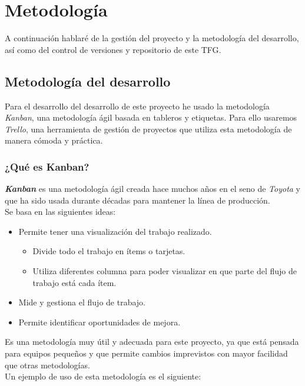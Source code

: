 \chapter{Metodología}

A continuación hablaré de la gestión del proyecto y la metodología del desarrollo, así como del control de versiones y repositorio de este \ac{TFG}.

\section{Metodología del desarrollo}

Para el desarrollo del desarrollo de este proyecto he usado la metodología \textit{Kanban}, una metodología ágil basada en tableros y etiquetas. Para ello usaremos \textit{Trello}, una herramienta de gestión de proyectos que utiliza esta metodología de manera cómoda y práctica.

\subsection{¿Qué es Kanban?}

\textit{\textbf{Kanban}} es una metodología ágil creada hace muchos años en el seno de \textit{Toyota} y que ha sido usada durante décadas para mantener la línea de producción.
\\

Se basa en las siguientes ideas:

\begin{itemize}
	\item Permite tener una visualización del trabajo realizado.
	\begin{itemize}
		\item Divide todo el trabajo en ítems o tarjetas.
		\item Utiliza diferentes columna para poder visualizar en que parte del flujo de trabajo está cada ítem.
	\end{itemize}
	\item Mide y gestiona el flujo de trabajo.
	\item Permite identificar oportunidades de mejora.
\end{itemize}


Es una metodología muy útil y adecuada para este proyecto, ya que está pensada para equipos pequeños y que permite cambios imprevistos con mayor facilidad que otras metodologías.
\\

Un ejemplo de uso de esta metodología es el siguiente:

